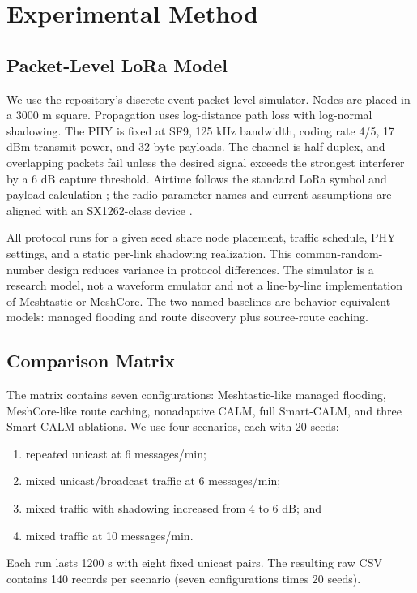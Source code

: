 \documentclass[10pt,conference,letterpaper]{IEEEtran}
\begin{document}
\section{Experimental Method}

\subsection{Packet-Level LoRa Model}

We use the repository's discrete-event packet-level simulator. Nodes are
placed in a 3000 m square. Propagation uses log-distance path loss with
log-normal shadowing. The PHY is fixed at SF9, 125 kHz bandwidth, coding rate
4/5, 17 dBm transmit power, and 32-byte payloads. The channel is half-duplex,
and overlapping packets fail unless the desired signal exceeds the strongest
interferer by a 6 dB capture threshold. Airtime follows the standard LoRa
symbol and payload calculation \cite{semtech2013lora}; the radio parameter
names and current assumptions are aligned with an SX1262-class device
\cite{semtech2024sx1262}.


All protocol runs for a given seed share node placement, traffic schedule,
PHY settings, and a static per-link shadowing realization. This common-random-
number design reduces variance in protocol differences. The simulator is a
research model, not a waveform emulator and not a line-by-line implementation
of Meshtastic or MeshCore. The two named baselines are behavior-equivalent
models: managed flooding and route discovery plus source-route caching.


\subsection{Comparison Matrix}

The matrix contains seven configurations: Meshtastic-like managed flooding,
MeshCore-like route caching, nonadaptive CALM, full Smart-CALM, and three
Smart-CALM ablations. We use four scenarios, each with 20 seeds:
\begin{enumerate}
\item repeated unicast at 6 messages/min;
\item mixed unicast/broadcast traffic at 6 messages/min;
\item mixed traffic with shadowing increased from 4 to 6 dB; and
\item mixed traffic at 10 messages/min.
\end{enumerate}
Each run lasts 1200 s with eight fixed unicast pairs. The resulting raw CSV
contains 140 records per scenario (seven configurations times 20 seeds).
\end{document}
